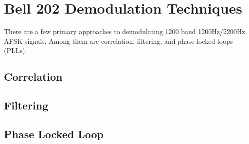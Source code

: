 \chapter{Bell 202 Demodulation Techniques}
There are a few primary approaches to demodulating 1200 baud 1200Hz/2200Hz AFSK signals. Among them are correlation, filtering, and phase-locked-loops (PLLs).

\section{Correlation}

\section{Filtering}

\section{Phase Locked Loop}
